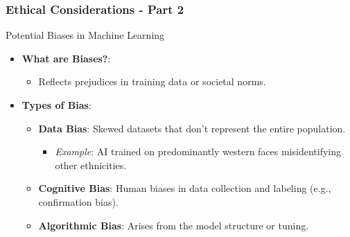 \documentclass[aspectratio=169]{beamer}
\begin{document}
\begin{frame}[fragile]
    \frametitle{Ethical Considerations - Part 2}
    \begin{block}{Potential Biases in Machine Learning}
        \begin{itemize}
            \item \textbf{What are Biases?}:
            \begin{itemize}
                \item Reflects prejudices in training data or societal norms.
            \end{itemize}
            \item \textbf{Types of Bias}:
            \begin{itemize}
                \item \textbf{Data Bias}: Skewed datasets that don't represent the entire population.
                    \begin{itemize}
                        \item \textit{Example}: AI trained on predominantly western faces misidentifying other ethnicities.
                    \end{itemize}
                \item \textbf{Cognitive Bias}: Human biases in data collection and labeling (e.g., confirmation bias).
                \item \textbf{Algorithmic Bias}: Arises from the model structure or tuning.
            \end{itemize}
        \end{itemize}
    \end{block}
\end{frame}
\end{document}
